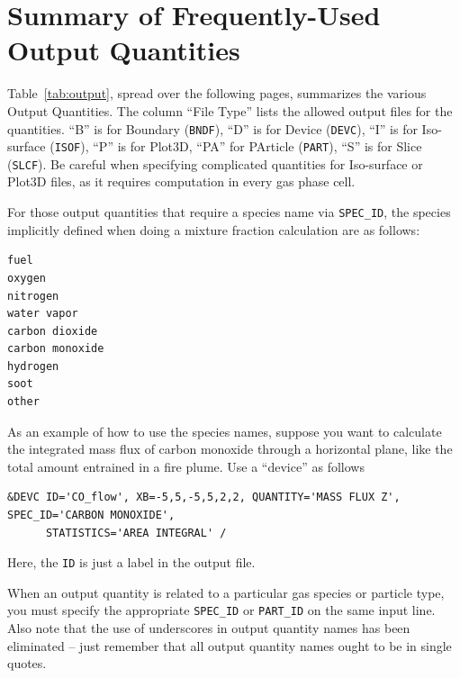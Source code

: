 \documentclass[11pt]{book}
\newcommand{\ct}{\tt\small}
\begin{document}
\clearpage
\section{Summary of Frequently-Used Output Quantities}
\label{info:outputquantities}

Table~\ref{tab:output}, spread over the following pages, summarizes the various Output Quantities.
The column ``File Type'' lists the allowed output files for the quantities. ``B'' is for Boundary ({\ct BNDF}),
``D'' is for Device ({\ct DEVC}), ``I'' is for Iso-surface ({\ct ISOF}), ``P'' is for Plot3D, ``PA'' for PArticle ({\ct PART}),
``S'' is for Slice ({\ct SLCF}). Be careful
when specifying complicated quantities for Iso-surface or Plot3D files, as it requires computation in every gas phase cell.

For those output quantities that require a species name via {\ct SPEC\_ID}, the species implicitly defined when doing a mixture
fraction calculation are as follows:

\footnotesize
\begin{verbatim}
fuel
oxygen
nitrogen
water vapor
carbon dioxide
carbon monoxide
hydrogen
soot
other
\end{verbatim}
\normalsize

\noindent
As an example of how to use the species names, suppose you want to calculate the integrated mass flux of carbon monoxide
through a horizontal plane, like the total amount entrained in a fire plume. Use a ``device'' as follows

\footnotesize
\begin{verbatim}
&DEVC ID='CO_flow', XB=-5,5,-5,5,2,2, QUANTITY='MASS FLUX Z', SPEC_ID='CARBON MONOXIDE',
      STATISTICS='AREA INTEGRAL' /
\end{verbatim}
\normalsize

\noindent
Here, the {\ct ID} is just a label in the output file.


\begin{warning}
When an output
quantity is related to a particular gas species or particle type, you must specify the appropriate {\ct SPEC\_ID} or
{\ct PART\_ID} on the same input line. Also note that the use of underscores in output quantity names has been eliminated -- just
remember that all output quantity names ought to be in single quotes.
\end{warning}

\clearpage
\end{document}
